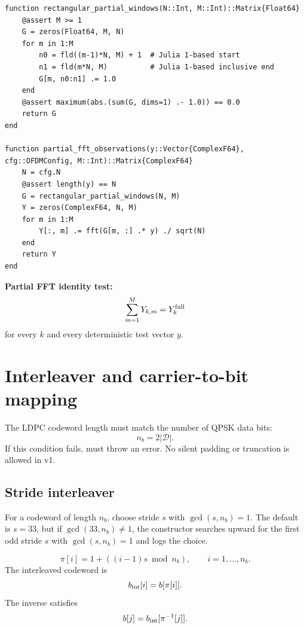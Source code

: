 \documentclass[11pt]{article}
\newcommand{\code}[1]{\texttt{\detokenize{#1}}}
\begin{document}
\begin{lstlisting}
function rectangular_partial_windows(N::Int, M::Int)::Matrix{Float64}
    @assert M >= 1
    G = zeros(Float64, M, N)
    for m in 1:M
        n0 = fld((m-1)*N, M) + 1  # Julia 1-based start
        n1 = fld(m*N, M)          # Julia 1-based inclusive end
        G[m, n0:n1] .= 1.0
    end
    @assert maximum(abs.(sum(G, dims=1) .- 1.0)) == 0.0
    return G
end

function partial_fft_observations(y::Vector{ComplexF64}, cfg::OFDMConfig, M::Int)::Matrix{ComplexF64}
    N = cfg.N
    @assert length(y) == N
    G = rectangular_partial_windows(N, M)
    Y = zeros(ComplexF64, N, M)
    for m in 1:M
        Y[:, m] .= fft(G[m, :] .* y) ./ sqrt(N)
    end
    return Y
end
\end{lstlisting}

\textbf{Partial FFT identity test:}
\begin{equation}
\sum_{m=1}^M Y_{k,m}=Y_k^{\rm full}
\end{equation}
for every $k$ and every deterministic test vector $y$.

\clearpage
\section{Interleaver and carrier-to-bit mapping}

The LDPC codeword length must match the number of QPSK data bits:
\begin{equation}
n_b=2|\mathcal D|.
\end{equation}
If this condition fails, \code{make_carrier_bit_map} must throw an error. No silent padding or truncation is allowed in v1.

\subsection{Stride interleaver}

For a codeword of length $n_b$, choose stride $s$ with $\gcd(s,n_b)=1$. The default is $s=33$, but if $\gcd(33,n_b)\ne1$, the constructor searches upward for the first odd stride $s$ with $\gcd(s,n_b)=1$ and logs the choice.

\begin{equation}
\pi[i]=1+((i-1)s\bmod n_b),\qquad i=1,\ldots,n_b.
\end{equation}
The interleaved codeword is
\begin{equation}
b_{\rm int}[i]=b[\pi[i]].
\end{equation}
The inverse satisfies
\begin{equation}
b[j]=b_{\rm int}[\pi^{-1}[j]].
\end{equation}
\end{document}
